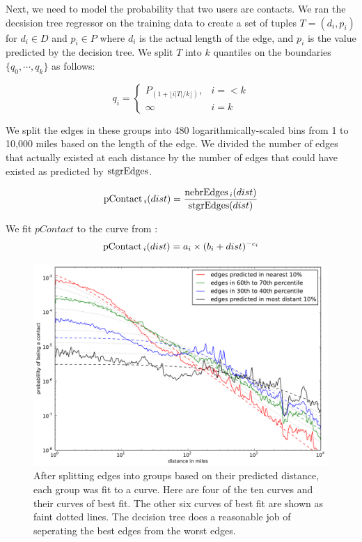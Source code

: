 Next, we need to model the probability that two users are contacts.
%
We ran the decsision tree regressor on the training data to create a set of
tuples $T = (d_i, p_i)$ for $d_i \in D$ and $p_i \in P$ where $d_i$ is the
actual length of the edge, and $p_i$ is the value predicted by the decision
tree.
%
We split $T$ into $k$ quantiles on the boundaries $\{q_0,\cdots,q_k\}$ as
follows:

\[
    q_i =
    \begin{cases}
        P_{(1+\lfloor i|T|/k \rfloor)}, & i=<k \\
        \infty & i=k
    \end{cases}
\]

We split the edges in these groups into 480 logarithmically-scaled bins from 1
to 10,000 miles based on the length of the edge.
%
We divided the number of edges that actually existed at each distance by the
number of edges that could have existed as predicted by $\operatorname{stgrEdges}$.

\[
\operatorname{pContact}{_i}(dist) = \frac{\operatorname{nebrEdges}{_i}(dist)}{\operatorname{stgrEdges}(dist)}
\]


We fit $pContact$ to the curve from \cite{backstrom2010find}:
\[
    \operatorname{pContact}{_i}(dist) = a_{i} \times (b_{i}+dist)^{-c_{i}}
\]


\begin{figure}[tbh]
\centering
\includegraphics[width=\linewidth]{figures/near_prob_fit.pdf}
\caption{
After splitting edges into groups based on their predicted distance, each group
was fit to a curve. Here are four of the ten curves and their curves of best
fit. The other six curves of best fit are shown as faint dotted lines. The
decision tree does a reasonable job of seperating the best edges from the worst
edges.
}
\label{fig:NearProbFit}
\end{figure}

